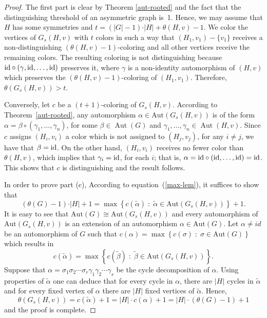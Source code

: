 \documentclass[12pt,a4paper, longbibliography]{article}
\newcommand{\Aut}{\ensuremath{\operatorname{Aut}}}
\newcommand{\id}{\ensuremath{\text{\rm id}}}
\newcommand{\aut}{\mathrm{Aut}}
\theoremstyle{definition}
\numberwithin{equation}{section}
\begin{document}
	\begin{proof}
		The first part is clear by Theorem \ref{aut-rooted} and the fact that the distinguishing threshold of an asymmetric graph is~1. Hence, we may assume that $H$ has some symmetries and  $t=\left(\vert G\vert-1\right)\cdot \vert H\vert+\theta (H,v)-1$. We color the  vertices of $G_s(H,v)$ with $t$ colors in such a way  that $(H_1,v_1) -  \{v_1\}$ receives a non-distinguishing $\left(\theta(H,v)-1\right)$-coloring and all other vertices receive the remaining colors. The resulting coloring is not distinguishing because $\id\circ(\gamma,\id,\ldots,\id)$ preserves it, where $\gamma$ is a non-identity automorphism of $(H,v)$ which preserves the $\left(\theta(H,v)-1\right)$-coloring of $(H_1,v_1)$. Therefore, $\theta \left(G_s(H,v)\right)>t$.
		
		Conversely, let $c$ be a  $(t+1)$-coloring of $G_s(H,v)$. According to Theorem~\ref{aut-rooted}, any automorphism $\alpha\in\aut(G_s(H,v))$ is of the form $\alpha=\beta\circ (\gamma_1,\ldots,\gamma_n)$, for some $\beta \in \Aut(G)$ and $\gamma_1,\ldots,\gamma_n\in\Aut(H,v)$.  Since $c$ assigns  $(H_i,v_i)$ a color which is not assigned to $(H_j,v_j)$, for any $i\neq j$, we have that $\beta=\id$. On the other hand, $(H_i, v_i)$ receives no fewer color than  $\theta(H,v)$, which implies that $\gamma_i=\id$, for each $i$; that is, $\alpha=\id\circ (\id,\ldots,\id)=\id$. This shows that $c$ is distinguishing and the result follows.

In order to prove part (c), According to equation~(\ref{max-lem}), it suffices to show that \[ \left(\theta(G)-1\right)\cdot \vert H\vert+1=\max\left\{c(\tilde{\alpha})\;:\; \tilde{\alpha}\in \aut(G_s(H,v)) \right\}+1 .\]
It is easy to see that $\aut(G) \cong \aut(G_s(H,v))$ and every automorphism of $\aut(G_s(H,v))$ is an extension of an automorphism $\alpha \in \aut(G)$. Let $\alpha \ne id$ be an automorphism of $G$ such that $c(\alpha) = \max\left\{c(\sigma)\;:\; \sigma\in \aut(G) \right\}$ which results in 
$$c(\tilde{\alpha}) = \max\left\{c(\tilde{\beta})\;:\; \tilde{\beta}\in \aut(G_s(H,v)) \right\}.$$
Suppose that $\alpha = \sigma_1 \sigma_2 \cdots \sigma_r \gamma_1 \gamma_2 \cdots \gamma_s$ be the cycle decomposition of $\alpha$. Using properties of $\tilde{\alpha}$ one can deduce that for every cycle in $\alpha$, there are $|H|$ cycles in $\tilde{\alpha}$ and for every fixed vertex of $\alpha$ there are $|H|$ fixed vertices of $\tilde{\alpha}$. Hence, \[\theta(G_s(H,v)) = c(\tilde{\alpha}) +1 = |H|\cdot c(\alpha) + 1= |H|\cdot (\theta(G) - 1) +1\]
and the proof is complete.
	\end{proof}
	
\end{document}
